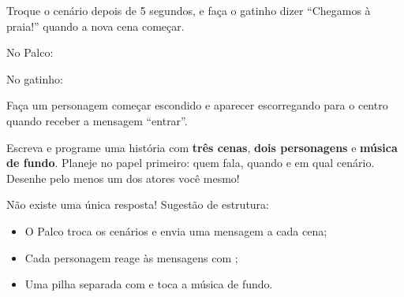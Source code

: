 \begin{exercicio}
Troque o cenário depois de 5 segundos, e faça o gatinho dizer ``Chegamos à praia!'' quando a nova cena começar.
\end{exercicio}

\begin{solucao}
No Palco:
\begin{pilha}
\end{pilha}
No gatinho:
\begin{pilha}
\end{pilha}
\end{solucao}

\begin{exercicio}
Faça um personagem começar escondido e aparecer escorregando para o centro quando receber a mensagem ``entrar''.
\end{exercicio}

\begin{solucao}
\begin{pilha}
\end{pilha}
\begin{pilha}
\end{pilha}
\end{solucao}

\begin{desafio}
Escreva e programe uma história com \textbf{três cenas}, \textbf{dois personagens} e \textbf{música de fundo}. Planeje no papel primeiro: quem fala, quando e em qual cenário. Desenhe pelo menos um dos atores você mesmo!
\end{desafio}

\begin{solucao}
Não existe uma única resposta! Sugestão de estrutura:
\begin{itemize}
\item O Palco troca os cenários e envia uma mensagem a cada cena;
\item Cada personagem reage às mensagens com ;
\item Uma pilha separada com  e  toca a música de fundo.
\end{itemize}
\end{solucao}
